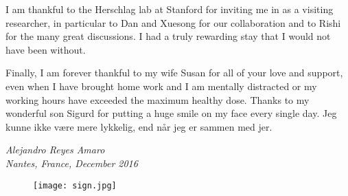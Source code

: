 I am thankful to the Herschlag lab at Stanford for inviting me in as a visiting researcher, in particular to Dan and Xuesong for our collaboration and to Rishi for the many great discussions. I had a truly rewarding stay that I would not have been without.

Finally, I am forever thankful to my wife Susan for all of your love and support, even when I have brought home work and I am mentally distracted or my working hours have exceeded the maximum healthy dose. Thanks to my wonderful son Sigurd for putting a huge smile on my face every single day. Jeg kunne ikke være mere lykkelig, end når jeg er sammen med jer.

\vspace*{3cm}
\begin{center}
\emph{
Alejandro {\sc Reyes Amaro}\\
\vspace*{0.2 cm}
Nantes, France, December 2016}
\begin{figure}[!h]
\centering
\texttt{[image: sign.jpg]}
\end{figure}
\end{center}
